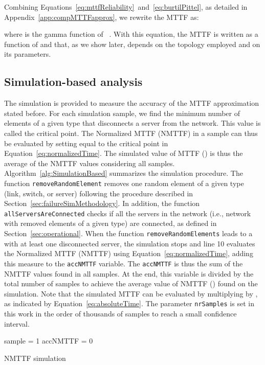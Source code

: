 Combining Equations~\ref{eq:mttfReliability}~and~\ref{eq:burtilPittel}, as detailed in Appendix~\ref{app:compMTTFapprox}, we rewrite the MTTF as:

where  is the gamma function of ~\cite{abramowitz1970handbook}. With this equation, the MTTF is written as a function of  and  that, as we show later, depends on the topology employed and on its parameters.

\subsection{Simulation-based analysis}

The simulation is provided to measure the accuracy of the MTTF approximation stated before.
For each simulation sample, we find the minimum number of  elements of a given type that disconnects a server from the network. This value is called the critical point.
The Normalized MTTF (NMTTF) in a sample can thus be evaluated by setting  equal to the critical point in Equation~\ref{eq:normalizedTime}. The simulated value of MTTF () is thus the
average of the NMTTF values considering all samples. Algorithm~\ref{alg:SimulationBased} summarizes the simulation procedure.
The function \texttt{removeRandomElement} removes one random element of a given type (link, switch, or server) following the procedure described in Section~\ref{sec:failureSimMethodology}.
In addition, the function \texttt{allServersAreConnected} checks if all the servers in the network  (i.e., network with  removed elements of a given type) are connected, as defined in Section~\ref{sec:operational}.
When the function \texttt{removeRandomElements} leads to a  with at least one disconnected server, the simulation stops and line 10 evaluates the Normalized MTTF (NMTTF) using Equation~\ref{eq:normalizedTime}, adding this measure to the \texttt{accNMTTF} variable. The \texttt{accNMTTF} is thus the sum of the NMTTF values found in all samples. At the end, this variable is divided by the total number of samples  to achieve the average value of NMTTF () found on the simulation. Note that the simulated MTTF can be evaluated by multiplying  by  , as indicated by Equation~\ref{eq:absoluteTime}.
The parameter \texttt{nrSamples} is set in this work in the order of thousands of samples to reach a small confidence interval.
\begin{algorithm}
\footnotesize
\SetAlgoLined
{}
sample = 1\;
accNMTTF = 0\;
\;
\caption{NMTTF simulation}
\label{alg:SimulationBased}
\end{algorithm}


